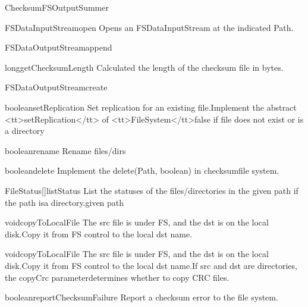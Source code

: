 \begin{XeClass}{ChecksumFSOutputSummer}
    \begin{XeMethod}{\XePublic}{FSDataInputStream}{open}
        Opens an FSDataInputStream at the indicated Path.
    \end{XeMethod}

    \begin{XeMethod}{\XePublic}{FSDataOutputStream}{append}
        
    \end{XeMethod}

    \begin{XeMethod}{\XePublic}{long}{getChecksumLength}
        Calculated the length of the checksum file in bytes.
    \end{XeMethod}

    \begin{XeMethod}{\XePublic}{FSDataOutputStream}{create}
        
    \end{XeMethod}

    \begin{XeMethod}{\XePublic}{boolean}{setReplication}
        Set replication for an existing file.Implement the abstract <tt>setReplication</tt> of <tt>FileSystem</tt>false if file does not exist or is a directory
    \end{XeMethod}

    \begin{XeMethod}{\XePublic}{boolean}{rename}
        Rename files/dirs
    \end{XeMethod}

    \begin{XeMethod}{\XePublic}{boolean}{delete}
        Implement the delete(Path, boolean) in checksumfile system.
    \end{XeMethod}

    \begin{XeMethod}{\XePublic}{FileStatus[]}{listStatus}
        List the statuses of the files/directories in the given path if the path isa directory.given path
    \end{XeMethod}

    \begin{XeMethod}{\XePublic}{void}{copyToLocalFile}
        The src file is under FS, and the dst is on the local disk.Copy it from FS control to the local dst name.
    \end{XeMethod}

    \begin{XeMethod}{\XePublic}{void}{copyToLocalFile}
        The src file is under FS, and the dst is on the local disk.Copy it from FS control to the local dst name.If src and dst are directories, the copyCrc parameterdetermines whether to copy CRC files.
    \end{XeMethod}

    \begin{XeMethod}{\XePublic}{boolean}{reportChecksumFailure}
        Report a checksum error to the file system.
    \end{XeMethod}

\end{XeClass}
